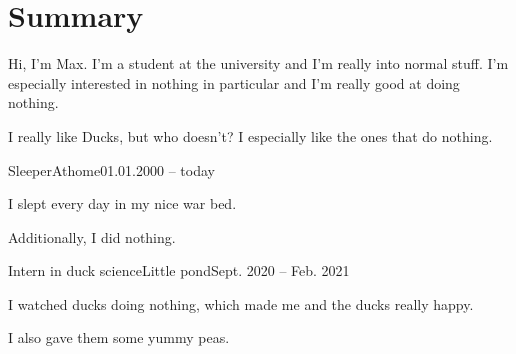 \documentclass[a4paper,11pt,color,coloraccent=darkmaroon]{awesomecv}
\author{Lukas Pietzschmann}
\begin{document}
	\maketitle

	\begin{infos}
		\hfill%
		\hfill%
		\address{12345, Atmyhome}\par%
		\hfill%
		\hfill%
	\end{infos}

	\section*{Summary}
	Hi, I'm Max. I'm a student at the university and I'm really into normal stuff.
	I'm especially interested in nothing in particular and I'm really good at doing
	nothing.\par
	I really like Ducks, but who doesn't? I especially like the ones that do nothing.

	\begin{education}
	\end{education}

	\begin{experience}
		\begin{entry}{Sleeper}{Athome}{01.01.2000 -- today}
			\item I slept every day in my nice war bed.
			\item Additionally, I did nothing.
		\end{entry}
		\begin{entry}{Intern in duck science}{Little pond}{Sept. 2020 -- Feb. 2021}
			\item I watched ducks doing nothing, which made me and the ducks really happy.
			\item I also gave them some yummy peas.
		\end{entry}
	\end{experience}

	\begin{publications}
	\end{publications}
\end{document}
